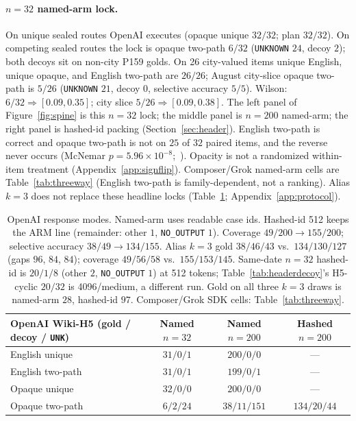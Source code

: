 \documentclass[10pt]{article} %
\begin{document}
\paragraph{$n{=}32$ named-arm lock.}
On unique sealed routes OpenAI executes (opaque unique $32/32$; plan
$32/32$).
On competing sealed routes the lock is opaque two-path $6/32$
(\texttt{UNKNOWN} $24$, decoy $2$); both decoys sit on non-city P159 golds.
On 26 city-valued items unique English, unique opaque, and English
two-path are $26/26$; August city-slice opaque two-path is $5/26$
(\texttt{UNKNOWN} $21$, decoy $0$, selective accuracy $5/5$).
Wilson: $6/32 \Rightarrow [0.09,0.35]$; city slice
$5/26 \Rightarrow [0.09,0.38]$.
The left panel of Figure~\ref{fig:spine} is this $n{=}32$ lock; the middle
panel is $n{=}200$ named-arm; the right panel is hashed-id packing
(Section~\ref{sec:header}).
English two-path is correct and opaque two-path is not on $25$ of $32$
paired items, and the reverse never occurs
(McNemar $p{=}5.96{\times}10^{-8}$;~\citealp{mcnemar1947}).
Opacity is not a randomized within-item treatment
(Appendix~\ref{app:signflip}).
Composer/Grok named-arm cells are Table~\ref{tab:threeway}
(English two-path is family-dependent, not a ranking).
Alias $k{=}3$ does not replace these headline locks
(Table~\ref{tab:modes}; Appendix~\ref{app:protocol}).

\begin{table}[htbp]
\centering
\small
\setlength{\tabcolsep}{3.5pt}

\caption{OpenAI response modes. Named-arm uses readable case ids.
Hashed-id 512 keeps the ARM line (remainder: other $1$, \texttt{NO\_OUTPUT} $1$).
Coverage $49/200\to 155/200$; selective accuracy $38/49\to 134/155$.
Alias $k{=}3$ gold $38/46/43$ vs.\ $134/130/127$ (gaps $96$, $84$, $84$);
coverage $49/56/58$ vs.\ $155/153/145$.
Same-date $n{=}32$ hashed-id is $20/1/8$ (other $2$, \texttt{NO\_OUTPUT} $1$)
at 512 tokens; Table~\ref{tab:headerdecoy}'s H5-cyclic $20/32$ is
4096/medium, a different run.
Gold on all three $k{=}3$ draws is named-arm $28$, hashed-id $97$.
Composer/Grok SDK cells: Table~\ref{tab:threeway}.}
\label{tab:modes}
\begin{tabular}{@{}lccc@{}}
\toprule
OpenAI Wiki-H5 (gold / decoy / \texttt{UNK}) & Named $n{=}32$ & Named $n{=}200$ & Hashed $n{=}200$ \\
\midrule
English unique & $31/0/1$ & $200/0/0$ & --- \\
English two-path & $31/0/1$ & $199/0/1$ & --- \\
Opaque unique & $32/0/0$ & $200/0/0$ & --- \\
Opaque two-path & $6/2/24$ & $38/11/151$ & $134/20/44$ \\
\bottomrule
\end{tabular}

\end{table}
\end{document}
